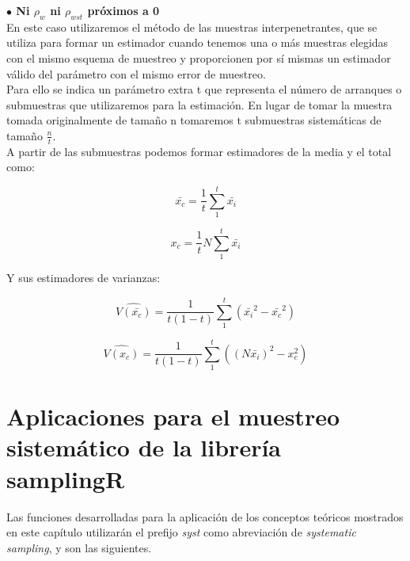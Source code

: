 \textbf{$\bullet$ Ni \boldmath$\rho_w$ ni \boldmath$\rho_{wst}$ próximos a 0}\\

En este caso utilizaremos el método de las muestras interpenetrantes, que se utiliza para formar un estimador cuando tenemos una o más muestras elegidas con el mismo esquema de muestreo y proporcionen por sí mismas un estimador válido del parámetro con el mismo error de muestreo.\\

Para ello se indica un parámetro extra t que representa el número de arranques o submuestras que utilizaremos para la estimación. En lugar de tomar la muestra tomada originalmente de tamaño n tomaremos t submuestras sistemáticas de tamaño $\frac{n}{t}$.\\

A partir de las submuestras podemos formar estimadores de la media y el total como:

\begin{equation}
    \bar{x_c} = \frac{1}{t}\sum_1^t\bar{x_i}
\end{equation}

\begin{equation}
    x_c = \frac{1}{t}N\sum_1^t\bar{x_i}
\end{equation}

Y sus estimadores de varianzas:

\begin{equation}
    \widehat{V(\bar{x_c})} = \frac{1}{t(1-t)}\sum_1^t(\bar{x_i}^2-\bar{x_c}^2)
\end{equation}

\begin{equation}
    \widehat{V(x_c)} = \frac{1}{t(1-t)}\sum_1^t((N\bar{x_i})^2-x_c^2)
\end{equation}

\section{Aplicaciones para el muestreo sistemático de la librería samplingR}

Las funciones desarrolladas para la aplicación de los conceptos teóricos mostrados en este capítulo utilizarán el prefijo \textit{syst} como abreviación de \textit{systematic sampling}, y son las siguientes.


